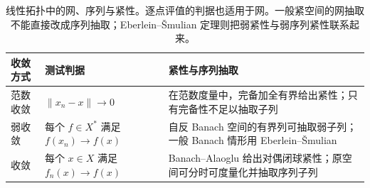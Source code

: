 \begin{table}[htbp]
\centering\small\renewcommand{\arraystretch}{1.18}\setlength{\tabcolsep}{4pt}
\caption[线性拓扑中的网、序列与紧性]{线性拓扑中的网、序列与紧性。逐点评值的判据也适用于网。一般紧空间的网抽取不能直接改成序列抽取；Eberlein--Šmulian 定理则把弱紧性与弱序列紧性联系起来。}
\label{b1:tab:norm-weak-weakstar}
\begin{tabularx}{\linewidth}{@{}>{\raggedright\arraybackslash}p{3.1cm}>{\raggedright\arraybackslash}p{4.7cm}>{\raggedright\arraybackslash}X@{}}
\toprule
收敛方式 & 测试判据 & 紧性与序列抽取 \\
\midrule
范数收敛 & \(\|x_n-x\|\to0\) & 在范数度量中，完备加全有界给出紧性；只有完备性不足以抽取子列 \\
弱收敛 & 每个 \(f\in X^*\) 满足 \(f(x_n)\to f(x)\) & 自反 Banach 空间的有界列可抽取弱子列；一般 Banach 情形用 Eberlein--Šmulian \\
\WeakStar{}收敛 & 每个 \(x\in X\) 满足 \(f_n(x)\to f(x)\) & Banach--Alaoglu 给出对偶闭球紧性；原空间可分时可度量化并抽取序列子列 \\
\bottomrule
\end{tabularx}
\end{table}
